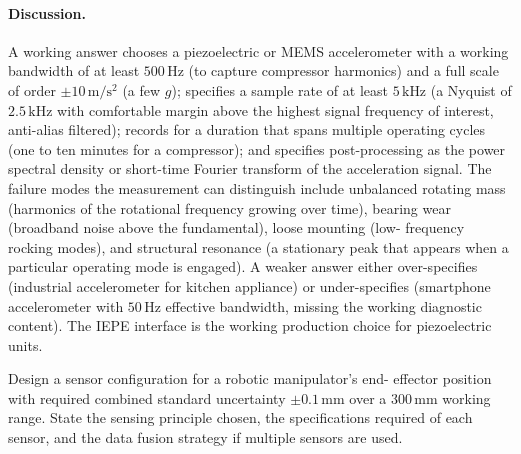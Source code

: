 \paragraph{Discussion.} A working answer chooses a piezoelectric
or MEMS accelerometer with a working bandwidth of at least
$500 \,\si{\hertz}$ (to capture compressor harmonics) and a full
scale of order $\pm 10 \,\si{\meter\per\second\squared}$ (a few
$g$); specifies a sample rate of at least $5 \,\si{\kilo\hertz}$
(a Nyquist of $2.5 \,\si{\kilo\hertz}$ with comfortable margin
above the highest signal frequency of interest, anti-alias
filtered); records for a duration that spans multiple operating
cycles (one to ten minutes for a compressor); and specifies
post-processing as the power spectral density or short-time
Fourier transform of the acceleration signal. The failure modes
the measurement can distinguish include unbalanced rotating mass
(harmonics of the rotational frequency growing over time), bearing
wear (broadband noise above the fundamental), loose mounting (low-
frequency rocking modes), and structural resonance (a stationary
peak that appears when a particular operating mode is engaged).
A weaker answer either over-specifies (industrial accelerometer
for kitchen appliance) or under-specifies (smartphone accelerometer
with $50 \,\si{\hertz}$ effective bandwidth, missing the working
diagnostic content). The IEPE interface
\cite{text:ch05-pallas-areny-webster2001} is the working production
choice for piezoelectric units.

\begin{exercise}
Design a sensor configuration for a robotic manipulator's end-
effector position with required combined standard uncertainty
$\pm 0.1 \,\si{\milli\meter}$ over a $300 \,\si{\milli\meter}$
working range. State the sensing principle chosen, the
specifications required of each sensor, and the data fusion
strategy if multiple sensors are used.
\end{exercise}

